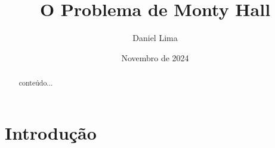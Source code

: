 \documentclass[onecolumn,12pt,a4paper]{article}
\title{O Problema de Monty Hall}
\author{Daniel Lima}
\date{Novembro de 2024}
\begin{document}
	\maketitle
	
	\begin{abstract}
		conteúdo...
	\end{abstract}
	
	\listoffigures
	
	\listoftables
	
	\tableofcontents
	
	\section{Introdução}
\end{document}
